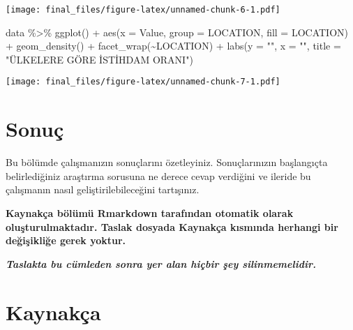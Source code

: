 \documentclass[
  12pt,
]{article}
\newenvironment{Shaded}{\begin{snugshade}}{\end{snugshade}}
\newcommand{\AttributeTok}[1]{\textcolor[rgb]{0.77,0.63,0.00}{#1}}
\newcommand{\FunctionTok}[1]{\textcolor[rgb]{0.00,0.00,0.00}{#1}}
\newcommand{\NormalTok}[1]{#1}
\newcommand{\SpecialCharTok}[1]{\textcolor[rgb]{0.00,0.00,0.00}{#1}}
\newcommand{\StringTok}[1]{\textcolor[rgb]{0.31,0.60,0.02}{#1}}
\newlength{\cslhangindent}
\newlength{\cslentryspacingunit} %
\newenvironment{CSLReferences}[2] %
 {%
  \setlength{\parindent}{0pt}
  \ifodd #1
  \let\oldpar\par
  \def\par{\hangindent=\cslhangindent\oldpar}
  \fi
  \setlength{\parskip}{#2\cslentryspacingunit}
 }%
 {}
\begin{document}
\texttt{[image: final\_files/figure-latex/unnamed-chunk-6-1.pdf]}

\begin{Shaded}
\begin{Highlighting}[]
\NormalTok{data }\SpecialCharTok{\%\textgreater{}\%}
  \FunctionTok{ggplot}\NormalTok{() }\SpecialCharTok{+}
  \FunctionTok{aes}\NormalTok{(}\AttributeTok{x =}\NormalTok{ Value, }\AttributeTok{group =}\NormalTok{ LOCATION, }\AttributeTok{fill =}\NormalTok{ LOCATION) }\SpecialCharTok{+}
  \FunctionTok{geom\_density}\NormalTok{() }\SpecialCharTok{+}
  \FunctionTok{facet\_wrap}\NormalTok{(}\SpecialCharTok{\textasciitilde{}}\NormalTok{LOCATION) }\SpecialCharTok{+}
  \FunctionTok{labs}\NormalTok{(}\AttributeTok{y =} \StringTok{""}\NormalTok{, }\AttributeTok{x =} \StringTok{""}\NormalTok{, }\AttributeTok{title =} \StringTok{"ÜLKELERE GÖRE İSTİHDAM ORANI"}\NormalTok{)}
\end{Highlighting}
\end{Shaded}

\texttt{[image: final\_files/figure-latex/unnamed-chunk-7-1.pdf]}

\hypertarget{sonuuxe7}{%
\section{Sonuç}\label{sonuuxe7}}

Bu bölümde çalışmanızın sonuçlarını özetleyiniz. Sonuçlarınızın başlangıçta belirlediğiniz araştırma sorusuna ne derece cevap verdiğini ve ileride bu çalışmanın nasıl geliştirilebileceğini tartışınız.

\textbf{Kaynakça bölümü Rmarkdown tarafından otomatik olarak oluşturulmaktadır. Taslak dosyada Kaynakça kısmında herhangi bir değişikliğe gerek yoktur.}

\textbf{\emph{Taslakta bu cümleden sonra yer alan hiçbir şey silinmemelidir.}}

\newpage

\hypertarget{references}{%
\section{Kaynakça}\label{references}}

\hypertarget{refs}{}
\begin{CSLReferences}{0}{0}
\end{CSLReferences}
\end{document}
